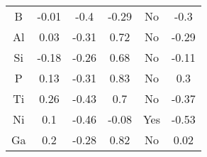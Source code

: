 \begin{table}[ht]
\begin{tabular}{cccccc}
B       & -0.01                                                     & -0.4                                                         & -0.29                                                     & No                                                                       & -0.3                                                           \\
Al      & 0.03                                                      & -0.31                                                        & 0.72                                                      & No                                                                       & -0.29                                                          \\
Si      & -0.18                                                     & -0.26                                                        & 0.68                                                      & No                                                                       & -0.11                                                          \\
P       & 0.13                                                      & -0.31                                                        & 0.83                                                      & No                                                                       & 0.3                                                            \\
Ti      & 0.26                                                      & -0.43                                                        & 0.7                                                       & No                                                                       & -0.37                                                          \\
Ni      & 0.1                                                       & -0.46                                                        & -0.08                                                     & Yes                                                                      & -0.53                                                          \\
Ga      & 0.2                                                       & -0.28                                                        & 0.82                                                      & No                                                                       & 0.02                                                           \\

\end{tabular}
\end{table}
